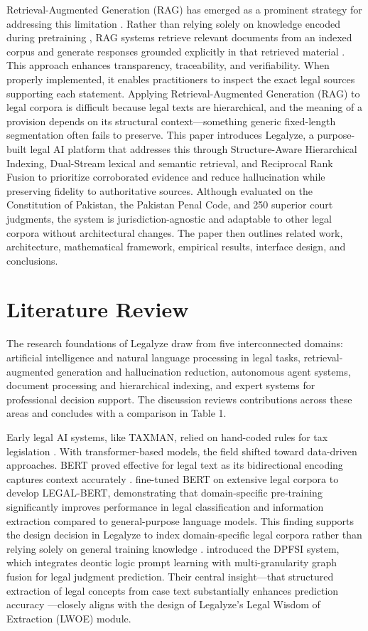 \documentclass[a4paper,fleqn]{cas-dc}
\begin{document}
Retrieval-Augmented Generation (RAG) has emerged as a prominent strategy for addressing this limitation \citep{11}. Rather than relying solely on knowledge encoded during pretraining \citep{12}, RAG systems retrieve relevant documents from an indexed corpus and generate responses grounded explicitly in that retrieved material \citep{13, 14, 15}. This approach enhances transparency, traceability, and verifiability. When properly implemented, it enables practitioners to inspect the exact legal sources supporting each statement.
Applying Retrieval-Augmented Generation (RAG) to legal corpora is difficult because legal texts are hierarchical, and the meaning of a provision depends on its structural context—something generic fixed-length segmentation often fails to preserve. This paper introduces Legalyze, a purpose-built legal AI platform that addresses this through Structure-Aware Hierarchical Indexing, Dual-Stream lexical and semantic retrieval, and Reciprocal Rank Fusion to prioritize corroborated evidence and reduce hallucination while preserving fidelity to authoritative sources. Although evaluated on the Constitution of Pakistan, the Pakistan Penal Code, and 250 superior court judgments, the system is jurisdiction-agnostic and adaptable to other legal corpora without architectural changes. The paper then outlines related work, architecture, mathematical framework, empirical results, interface design, and conclusions.

\section{Literature Review}
The research foundations of Legalyze draw from five interconnected domains: artificial intelligence and natural language processing in legal tasks, retrieval-augmented generation and hallucination reduction, autonomous agent systems, document processing and hierarchical indexing, and expert systems for professional decision support. The discussion reviews contributions across these areas and concludes with a comparison in Table 1.

Early legal AI systems, like TAXMAN, relied on hand-coded rules for tax legislation \citep{16}. With transformer-based models, the field shifted toward data-driven approaches. BERT \citep{7} proved effective for legal text as its bidirectional encoding captures context accurately \citep{18}. \citet{4} fine-tuned BERT on extensive legal corpora to develop LEGAL-BERT, demonstrating that domain-specific pre-training significantly improves performance in legal classification and information extraction compared to general-purpose language models. This finding supports the design decision in Legalyze to index domain-specific legal corpora rather than relying solely on general training knowledge \citep{19}. \citet{17} introduced the DPFSI system, which integrates deontic logic prompt learning with multi-granularity graph fusion for legal judgment prediction. Their central insight—that structured extraction of legal concepts from case text substantially enhances prediction accuracy \citep{20}—closely aligns with the design of Legalyze’s Legal Wisdom of Extraction (LWOE) module.
\end{document}
